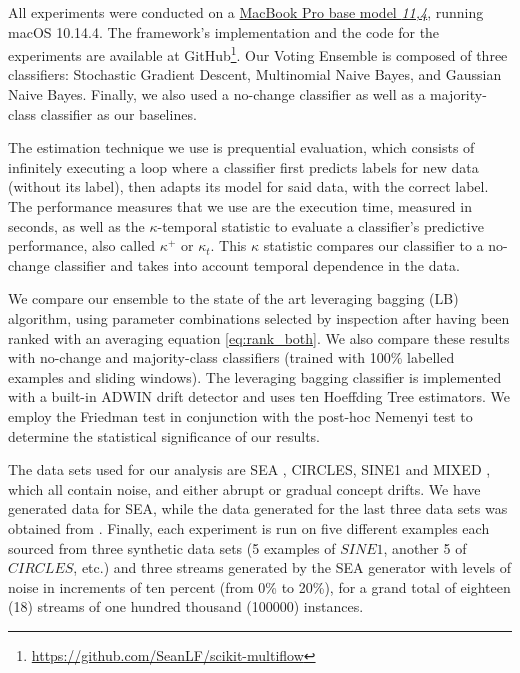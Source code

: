 \documentclass[runningheads]{llncs}
\begin{document}
All experiments were conducted on a \href{https://everymac.com/systems/apple/macbook_pro/specs/macbook-pro-core-i7-2.2-15-iris-only-mid-2015-retina-display-specs.html}{MacBook Pro base model \textit{11,4}}, running macOS 10.14.4. The framework's implementation and the code for the experiments are available at GitHub\footnote{\url{https://github.com/SeanLF/scikit-multiflow}}.
Our Voting Ensemble is composed of three classifiers: Stochastic Gradient Descent, Multinomial Naive Bayes, and Gaussian Naive Bayes. Finally, we also used a no-change classifier as well as a majority-class classifier as our baselines.

The estimation technique we use is prequential evaluation, which consists of infinitely executing a loop where a classifier first predicts labels for new data (without its label), then adapts its model for said data, with the correct label.
The performance measures that we use are the execution time, measured in seconds, as well as the $\kappa$-temporal statistic to evaluate a classifier's predictive performance, also called $\kappa^+$ or $\kappa_t$. This $\kappa$ statistic compares our classifier to a no-change classifier and takes into account temporal dependence in the data.

We compare our ensemble to the state of the art leveraging bagging (LB) algorithm, using parameter combinations selected by inspection after having been ranked with an averaging equation \ref{eq:rank_both}. We also compare these results with no-change and majority-class classifiers (trained with 100\% labelled examples and sliding windows). The leveraging bagging classifier is implemented with a built-in ADWIN drift detector and uses ten Hoeffding Tree estimators. We employ the Friedman test in conjunction with the post-hoc Nemenyi test to determine the statistical significance of our results.

The data sets used for our analysis are SEA \cite{street2001streaming}, CIRCLES, SINE1 and MIXED \cite{10.1007/3-540-59286-5_74}, which all contain noise, and either abrupt or gradual concept drifts. We have generated data for SEA, while the data generated for the last three data sets was obtained from \cite{pesaranghader2016fast}. Finally, each experiment is run on five different examples each sourced from three synthetic data sets (5 examples of $SINE1$, another 5 of $CIRCLES$, etc.) and three streams generated by the SEA generator with levels of noise in increments of ten percent (from 0\% to 20\%), for a grand total of eighteen (18) streams of one hundred thousand (100000) instances.
\end{document}
